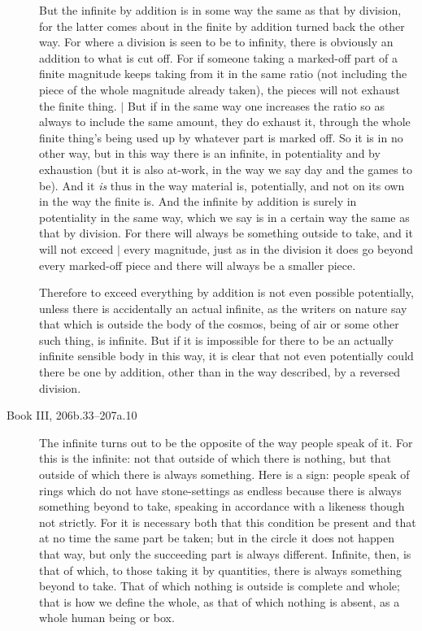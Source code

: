 \documentclass[twoside,openright]{article}
\begin{document}
\begin{description}
  But the infinite by addition is in some way the same as that by
  division, for the latter comes about in the finite by addition
  turned back the other way.  For where a division is seen to be to
  infinity, there is obviously an addition to what is cut off.  For if
  someone taking a marked-off part of a finite magnitude keeps taking
  from it in the same ratio (not including the piece of the whole
  magnitude already taken), the pieces will not exhaust the finite
  thing. $|$ But if in the same way one increases
  the ratio so as always to include the same amount, they do exhaust
  it, through the whole finite thing's being used up by whatever part
  is marked off.  So it is in no other way, but in this way there is
  an infinite, in potentiality and by exhaustion (but it is also
  at-work, in the way we say day and the games to be).  And it
  \emph{is} thus in the way material is, potentially, and not on its
  own in the way the finite is.  And the infinite by addition is
  surely in potentiality in the same way, which we say is in a certain
  way the same as that by division.  For there will always be
  something outside to take, and it will not exceed
  $|${\reversemarginpar{}} every magnitude, just as
  in the division it does go beyond every marked-off piece and there
  will always be a smaller piece.

  Therefore to exceed everything by addition is not even possible
  potentially, unless there is accidentally an actual infinite, as the
  writers on nature say that which is outside the body of the cosmos,
  being of air or some other such thing, is infinite.  But if it is
  impossible for there to be an actually infinite sensible body in
  this way, it is clear that not even potentially could there be one
  by addition, other than in the way described, by a reversed
  division.

\item [Book III, 206b.33--207a.10] The infinite turns out to be the
  opposite of the way people speak of it.  For this is the infinite:
  not that outside of which there is nothing, but that outside of
  which there is always something.  Here is a sign: people speak of
  rings which do not have stone-settings as endless because there is
  always something beyond to take, speaking in accordance with a
  likeness though not strictly.  For it is necessary both that this
  condition be present and that at no time the same part be taken; but
  in the circle it does not happen that way, but only the succeeding
  part is always different.  Infinite, then, is that of which, to
  those taking it by quantities, there is always something beyond to
  take.  That of which nothing is outside is complete and whole; that
  is how we define the whole, as that of which nothing is absent, as a
  whole human being or box.


\end{description}
\end{document}
